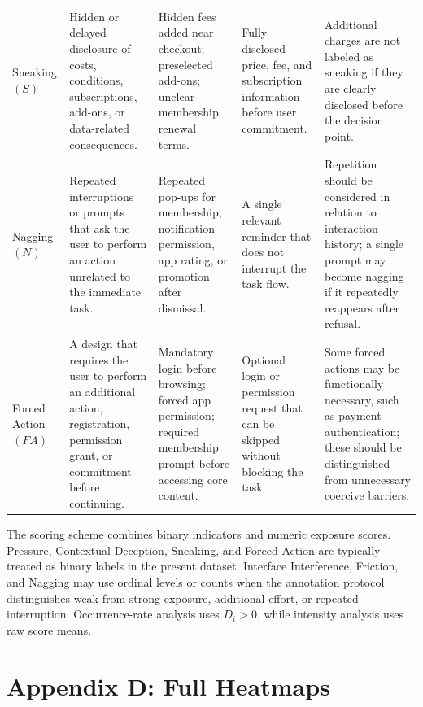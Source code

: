 \begin{table}[htbp]
\begin{tabularx}{\textwidth}{@{}p{1.75cm}XXXX@{}}
        Sneaking \((S)\) &
        Hidden or delayed disclosure of costs, conditions, subscriptions, add-ons, or data-related consequences. &
        Hidden fees added near checkout; preselected add-ons; unclear membership renewal terms. &
        Fully disclosed price, fee, and subscription information before user commitment. &
        Additional charges are not labeled as sneaking if they are clearly disclosed before the decision point. \\
        \addlinespace

        Nagging \((N)\) &
        Repeated interruptions or prompts that ask the user to perform an action unrelated to the immediate task. &
        Repeated pop-ups for membership, notification permission, app rating, or promotion after dismissal. &
        A single relevant reminder that does not interrupt the task flow. &
        Repetition should be considered in relation to interaction history; a single prompt may become nagging if it repeatedly reappears after refusal. \\
        \addlinespace

        Forced Action \((FA)\) &
        A design that requires the user to perform an additional action, registration, permission grant, or commitment before continuing. &
        Mandatory login before browsing; forced app permission; required membership prompt before accessing core content. &
        Optional login or permission request that can be skipped without blocking the task. &
        Some forced actions may be functionally necessary, such as payment authentication; these should be distinguished from unnecessary coercive barriers. \\
        \bottomrule
    \end{tabularx}
\end{table}

The scoring scheme combines binary indicators and numeric exposure scores. Pressure, Contextual Deception, Sneaking, and Forced Action are typically treated as binary labels in the present dataset. Interface Interference, Friction, and Nagging may use ordinal levels or counts when the annotation protocol distinguishes weak from strong exposure, additional effort, or repeated interruption. Occurrence-rate analysis uses \(D_i>0\), while intensity analysis uses raw score means.

\section{Appendix D: Full Heatmaps}
\label{app:full-heatmaps}

